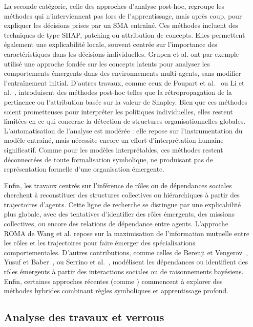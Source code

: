 La seconde catégorie, celle des approches d’analyse post-hoc, regroupe les méthodes qui n'interviennent pas lors de l'apprentissage, mais après coup, pour expliquer les décisions prises par un SMA entraîné. Ces méthodes incluent des techniques de type SHAP, patching ou attribution de concepts. Elles permettent également une explicabilité locale, souvent centrée sur l'importance des caractéristiques dans les décisions individuelles. Grupen et al. \cite{grupen2022concept} ont par exemple utilisé une approche fondée sur les concepts latents pour analyser les comportements émergents dans des environnements multi-agents, sans modifier l'entraînement initial. D'autres travaux, comme ceux de Poupart et al.~\cite{poupart2025perspectives} ou Li et al.~\cite{li2025from}, introduisent des méthodes post-hoc telles que la rétropropagation de la pertinence ou l'attribution basée sur la valeur de Shapley. Bien que ces méthodes soient prometteuses pour interpréter les politiques individuelles, elles restent limitées en ce qui concerne la détection de structures organisationnelles globales. L’automatisation de l’analyse est modérée : elle repose sur l’instrumentation du modèle entraîné, mais nécessite encore un effort d’interprétation humaine significatif. Comme pour les modèles interprétables, ces méthodes restent déconnectées de toute formalisation symbolique, ne produisant pas de représentation formelle d’une organisation émergente.

Enfin, les travaux centrés sur l’inférence de rôles ou de dépendances sociales cherchent à reconstituer des structures collectives ou hiérarchiques à partir des trajectoires d'agents. Cette ligne de recherche se distingue par une explicabilité plus globale, avec des tentatives d’identifier des rôles émergents, des missions collectives, ou encore des relations de dépendance entre agents. L’approche ROMA de Wang et al. \cite{Wang2020} repose sur la maximisation de l’information mutuelle entre les rôles et les trajectoires pour faire émerger des spécialisations comportementales. D'autres contributions, comme celles de Berenji et Vengerov~\cite{berenji2000learning}, Yusuf et Baber~\cite{yusuf2020inferential}, ou Serrino et al.~\cite{serrino2019finding}, modélisent les dépendances ou identifient des rôles émergents à partir des interactions sociales ou de raisonnements bayésiens. Enfin, certaines approches récentes (comme \cite{subramanian2024neurosymbolic}) commencent à explorer des méthodes hybrides combinant règles symboliques et apprentissage profond.

\subsection*{Analyse des travaux et verrous}

